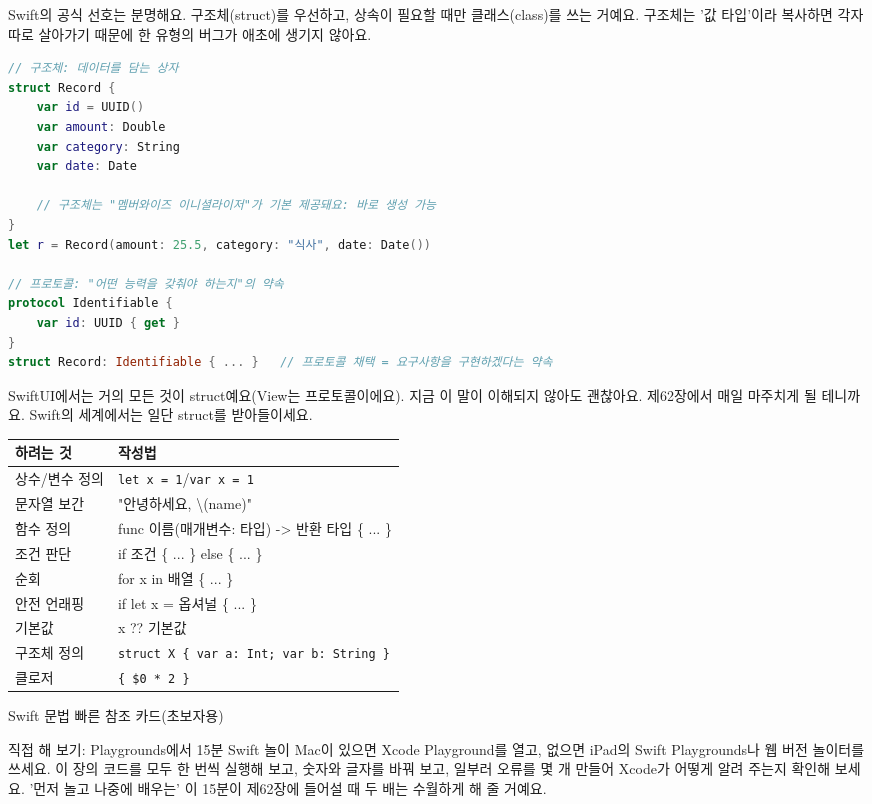
Swift의 공식 선호는 분명해요. 구조체(struct)를 우선하고, 상속이 필요할 때만 클래스(class)를 쓰는 거예요. 구조체는 '값 타입'이라 복사하면 각자 따로 살아가기 때문에 한 유형의 버그가 애초에 생기지 않아요.

\begin{lstlisting}[language=Swift]
// 구조체: 데이터를 담는 상자
struct Record {
    var id = UUID()
    var amount: Double
    var category: String
    var date: Date

    // 구조체는 "멤버와이즈 이니셜라이저"가 기본 제공돼요: 바로 생성 가능
}
let r = Record(amount: 25.5, category: "식사", date: Date())

// 프로토콜: "어떤 능력을 갖춰야 하는지"의 약속
protocol Identifiable {
    var id: UUID { get }
}
struct Record: Identifiable { ... }   // 프로토콜 채택 = 요구사항을 구현하겠다는 약속
\end{lstlisting}

SwiftUI에서는 거의 모든 것이 struct예요(View는 프로토콜이에요). 지금 이 말이 이해되지 않아도 괜찮아요. 제62장에서 매일 마주치게 될 테니까요. Swift의 세계에서는 일단 struct를 받아들이세요.


\begin{center}
\begin{tabularx}{\linewidth}{|X|X|}
\hline
\textbf{하려는 것} & \textbf{작성법} \tabularnewline
\hline
상수/변수 정의 & \texttt{let x = 1}/\texttt{var x = 1} \tabularnewline
문자열 보간 & "안녕하세요, \textbackslash{}(name)" \tabularnewline
함수 정의 & func 이름(매개변수: 타입) -> 반환 타입 \{ ... \} \tabularnewline
조건 판단 & if 조건 \{ ... \} else \{ ... \} \tabularnewline
순회 & for x in 배열 \{ ... \} \tabularnewline
안전 언래핑 & if let x = 옵셔널 \{ ... \} \tabularnewline
기본값 & x ?? 기본값 \tabularnewline
구조체 정의 & \texttt{struct X \{ var a: Int; var b: String \}} \tabularnewline
클로저 & \texttt{\{ \$0 * 2 \}} \tabularnewline
\hline
\end{tabularx}
\end{center}

\begin{center}\small\color{gray}Swift 문법 빠른 참조 카드(초보자용)\end{center}

\begin{tcbpractice}{직접 해 보기: Playgrounds에서 15분 Swift 놀이}
Mac이 있으면 Xcode Playground를 열고, 없으면 iPad의 Swift Playgrounds나 웹 버전 놀이터를 쓰세요. 이 장의 코드를 모두 한 번씩 실행해 보고, 숫자와 글자를 바꿔 보고, 일부러 오류를 몇 개 만들어 Xcode가 어떻게 알려 주는지 확인해 보세요. '먼저 놀고 나중에 배우는' 이 15분이 제62장에 들어설 때 두 배는 수월하게 해 줄 거예요.

\end{tcbpractice}

